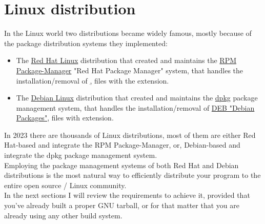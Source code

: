 \chapter{Linux distribution}

In the Linux world two distributions became widely famous, mostly because of the package distribution systems they implemented: 
\begin{itemize}
\item The \href{https://www.redhat.com}{Red Hat Linux} distribution that created and maintains the \href{https://en.wikipedia.org/wiki/RPM\_Package\_Manager}{RPM Package-Manager} "Red Hat Package Manager" system, that handles the installation/removal of \iffalse the following reference is missing \fi \href{RPM "Red Hat Packages"}, files with the  extension.
\item The \href{https://www.debian.org}{Debian Linux} distribution that created and maintains the \href{https://en.wikipedia.org/wiki/Dpkg}{dpkg} package management system, that handles the installation/removal of \href{https://en.wikipedia.org/wiki/Deb\_(file\_format)}{DEB "Debian Packages"}, files with  extension.
\end{itemize}
In 2023 there are thousands of Linux distributions, most of them are either Red Hat-based and integrate the RPM Package-Manager, or, Debian-based and integrate the dpkg package management system. \\
Employing the package management systems of both Red Hat and Debian distributions is the most natural way to efficiently distribute your program to the entire open source / Linux community. \\
In the next sections I will review the requirements to achieve it, provided that you've already built a proper GNU tarball, or for that matter that you are already using any other build system. 
\clearpage





